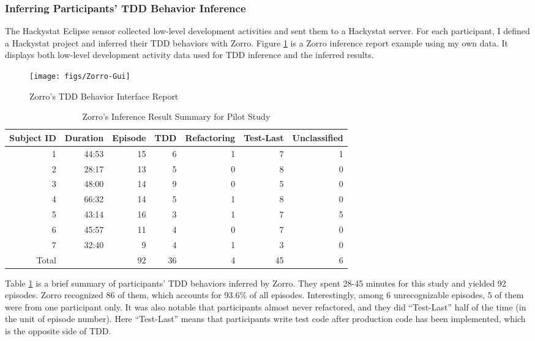 \subsubsection{Inferring Participants' TDD Behavior Inference}
The Hackystat Eclipse sensor collected low-level development
activities and sent them to a Hackystat server. For each participant,
I defined a Hackystat project and inferred their TDD behaviors with
Zorro. Figure \ref{fig:gui} is a Zorro inference report example using my 
own data. It displays both low-level development activity data used 
for TDD inference and the inferred results. 
\begin{figure}[htbp]
  \centering
  \texttt{[image: figs/Zorro-Gui]}
  \caption{Zorro's TDD Behavior Interface Report}\label{fig:gui}
\end{figure}

\begin{table}[htbp]
\centering
  \caption{Zorro's Inference Result Summary for Pilot Study}\label{tab:ZorroPilotStudy}  
  \begin{tabular}{|r|r|r|r|r|r|r|}
  \hline
    Subject ID & Duration & Episode & TDD & Refactoring & Test-Last & Unclassified \\ \hline
    1 & 44:53 & 15 &  6 &  1 &  7 & 1 \\ \hline
    2 & 28:17 & 13 &  5 &  0 &  8 & 0 \\ \hline
    3 & 48:00 & 14 &  9 &  0 &  5 & 0 \\ \hline
    4 & 66:32 & 14 &  5 &  1 &  8 & 0 \\ \hline
    5 & 43:14 & 16 &  3 &  1 &  7 & 5 \\ \hline
    6 & 45:57 & 11 &  4 &  0 &  7 & 0 \\ \hline
    7 & 32:40 &  9 &  4 &  1 &  3 & 0 \\ \hline \hline
    Total &   & 92 & 36 &  4 & 45 & 6 \\ 
  \hline
  \end{tabular}
\end{table}
Table \ref{tab:ZorroPilotStudy} is a brief summary of participants'
TDD behaviors inferred by Zorro. They spent 28-45 minutes for this
study and yielded 92 episodes. Zorro recognized 86 of them, which
accounts for 93.6\% of all episodes. Interestingly, among 6
unrecognizable episodes, 5 of them were from one participant only. It
was also notable that participants almost never refactored, and they
did ``Test-Last'' half of the time (in the unit of episode number).
Here ``Test-Last'' means that participants write test code after
production code has been implemented, which is the opposite side of
TDD.

